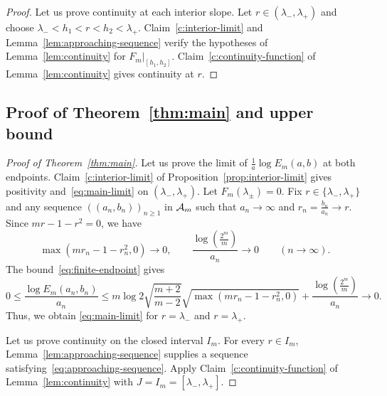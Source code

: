 \begin{proof}
 Let us prove continuity at each interior slope.
Let $r\in(\lambda_-,\lambda_+)$ and choose
$\lambda_-<h_1<r<h_2<\lambda_+$.
Claim~\ref{c:interior-limit} and Lemma~\ref{lem:approaching-sequence} verify the hypotheses of
Lemma~\ref{lem:continuity} for $F_m|_{[h_1,h_2]}$.
Claim~\ref{c:continuity-function} of Lemma~\ref{lem:continuity} gives continuity at $r$.
\end{proof}

\subsection{\texorpdfstring{Proof of Theorem~\ref{thm:main} and upper bound}{Proof of Theorem 1.1 and upper bound}}
\begin{proof}[Proof of Theorem~\ref{thm:main}]
Let us prove the limit of $\frac1a\log E_m(a,b)$ at both endpoints.
Claim~\ref{c:interior-limit} of Proposition~\ref{prop:interior-limit} gives positivity and~\eqref{eq:main-limit}
on $(\lambda_-,\lambda_+)$. Let $F_m(\lambda_\pm)=0$.
Fix $r\in\{\lambda_-,\lambda_+\}$ and any sequence $((a_n,b_n))_{n\ge1}$ in $\mathcal A_m$ such that
$a_n\to\infty$ and $r_n=\frac{b_n}{a_n}\to r$.
Since $mr-1-r^2=0$, we have
\[
 \max(mr_n-1-r_n^2,0)\longrightarrow0,
 \qquad
 \frac{\log(\frac{2^m}{m})}{a_n}\longrightarrow0
 \qquad(n\to\infty).
\]
The bound~\eqref{eq:finite-endpoint} gives
\[
 0\le\frac{\log E_m(a_n,b_n)}{a_n}
 \le m\log2\sqrt{\frac{m+2}{m-2}}\sqrt{\max(mr_n-1-r_n^2,0)}
   +\frac{\log(\frac{2^m}{m})}{a_n}\longrightarrow0.
\]
Thus, we obtain
\eqref{eq:main-limit} for $r=\lambda_-$ and $r=\lambda_+$.

Let us prove continuity on the closed interval $I_m$.
For every $r\in I_m$, Lemma~\ref{lem:approaching-sequence} supplies a sequence satisfying~\eqref{eq:approaching-sequence}.
Apply Claim~\ref{c:continuity-function} of Lemma~\ref{lem:continuity} with $J=I_m=[\lambda_-,\lambda_+]$.
\end{proof}

